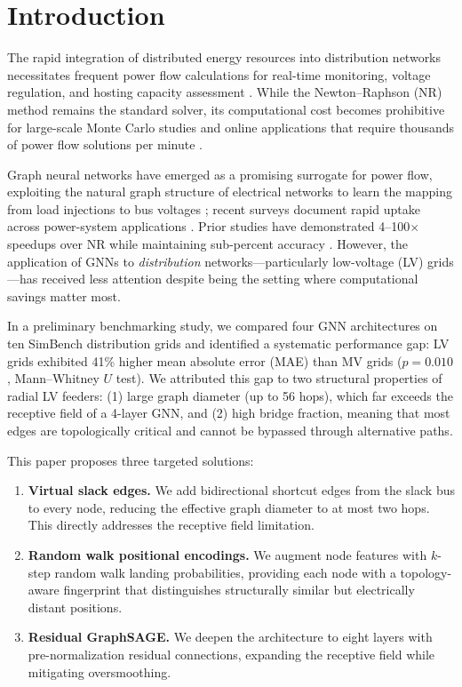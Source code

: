 \documentclass[preprint,review,12pt]{elsarticle}
\begin{document}
\linenumbers

\section{Introduction}
\label{sec:introduction}

The rapid integration of distributed energy resources into distribution networks necessitates frequent power flow calculations for real-time monitoring, voltage regulation, and hosting capacity assessment \cite{b1}. While the Newton--Raphson (NR) method remains the standard solver, its computational cost becomes prohibitive for large-scale Monte Carlo studies and online applications that require thousands of power flow solutions per minute \cite{b2}.

Graph neural networks have emerged as a promising surrogate for power flow, exploiting the natural graph structure of electrical networks to learn the mapping from load injections to bus voltages \cite{b3,b4}; recent surveys document rapid uptake across power-system applications \cite{b33}. Prior studies have demonstrated 4--100$\times$ speedups over NR while maintaining sub-percent accuracy \cite{b5,b6}. However, the application of GNNs to \emph{distribution} networks---particularly low-voltage (LV) grids---has received less attention despite being the setting where computational savings matter most.

In a preliminary benchmarking study, we compared four GNN architectures on ten SimBench distribution grids and identified a systematic performance gap: LV grids exhibited 41\% higher mean absolute error (MAE) than MV grids ($p=0.010$, Mann--Whitney $U$ test). We attributed this gap to two structural properties of radial LV feeders: (1) large graph diameter (up to 56 hops), which far exceeds the receptive field of a 4-layer GNN, and (2) high bridge fraction, meaning that most edges are topologically critical and cannot be bypassed through alternative paths.

This paper proposes three targeted solutions:
\begin{enumerate}
\item \textbf{Virtual slack edges.} We add bidirectional shortcut edges from the slack bus to every node, reducing the effective graph diameter to at most two hops. This directly addresses the receptive field limitation.
\item \textbf{Random walk positional encodings.} We augment node features with $k$-step random walk landing probabilities, providing each node with a topology-aware fingerprint that distinguishes structurally similar but electrically distant positions.
\item \textbf{Residual GraphSAGE.} We deepen the architecture to eight layers with pre-normalization residual connections, expanding the receptive field while mitigating oversmoothing.
\end{enumerate}
\end{document}
